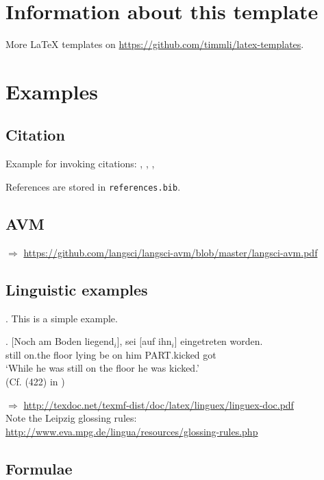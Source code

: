\section{Information about this template}

More \LaTeX{} templates on \url{https://github.com/timmli/latex-templates}.

\section{Examples}

\subsection{Citation}

Example for invoking citations: \cite{Bech:63}, \citet[291]{Bech:63}, \citep{Bech:63}, \citealt{Bech:63}

References are stored in \texttt{references.bib}.

\subsection{AVM}


\medskip

\noindent $\Rightarrow$ \url{https://github.com/langsci/langsci-avm/blob/master/langsci-avm.pdf}

\subsection{Linguistic examples}

\ex. This is a simple example.

\exg. [Noch am Boden liegend$_i$], sei [auf ihn$_i$] eingetreten worden.\\
still on.the floor lying be on him PART.kicked got\\
`While he was still on the floor he was kicked.'\\
(Cf. (422) in \citealt{Mueller:02})

\noindent $\Rightarrow$ \url{http://texdoc.net/texmf-dist/doc/latex/linguex/linguex-doc.pdf} \\
Note the Leipzig glossing rules: \url{http://www.eva.mpg.de/lingua/resources/glossing-rules.php}

\subsection{Formulae}

